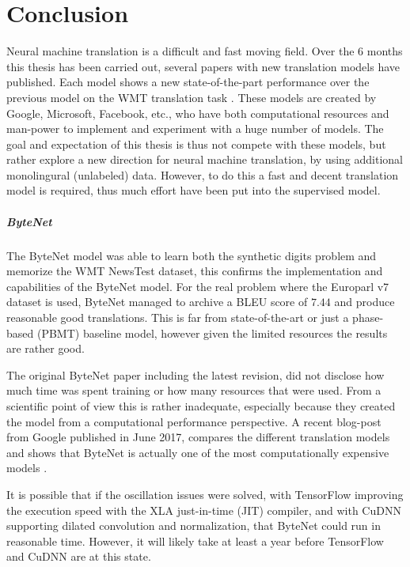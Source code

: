 \chapter{Conclusion}

Neural machine translation is a difficult and fast moving field. Over the 6 months this thesis has been carried out, several papers with new translation models have published. Each model shows a new state-of-the-part performance over the previous model on the WMT translation task \cite{bytenet, attention-is-all-you-need, tensor2tensor}. These models are created by Google, Microsoft, Facebook, etc., who have both computational resources and man-power to implement and experiment with a huge number of models. The goal and expectation of this thesis is thus not compete with these models, but rather explore a new direction for neural machine translation, by using additional monolingural (unlabeled) data. However, to do this a fast and decent translation model is required, thus much effort have been put into the supervised model.

\paragraph{ByteNet} The ByteNet model was able to learn both the synthetic digits problem and memorize the WMT NewsTest dataset, this confirms the implementation and capabilities of the ByteNet model. For the real problem where the Europarl v7 dataset is used, ByteNet managed to archive a BLEU score of $7.44$ and produce reasonable good translations. This is far from state-of-the-art or just a phase-based (PBMT) baseline model, however given the limited resources the results are rather good.

The original ByteNet paper including the latest revision, did not disclose how much time was spent training or how many resources that were used. From a scientific point of view this is rather inadequate, especially because they created the model from a computational performance perspective. A recent blog-post from Google published in June 2017, compares the different translation models and shows that ByteNet is actually one of the most computationally expensive models \cite{tensor2tensor}.

It is possible that if the oscillation issues were solved, with TensorFlow improving the execution speed with the XLA just-in-time (JIT) compiler, and with CuDNN supporting dilated convolution and normalization, that ByteNet could run in reasonable time. However, it will likely take at least a year before TensorFlow and CuDNN are at this state.

